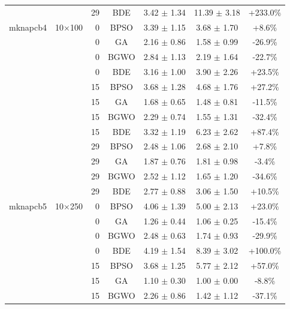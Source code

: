 \begin{table}[htbp]
\begin{tabular}{llrcccc}
             &          & 29 & BDE   & 3.42 $\pm$ 1.34    & 11.39 $\pm$ 3.18   & +233.0\% \\
mknapcb4     & 10×100   & 0 & BPSO  & 3.39 $\pm$ 1.15    & 3.68 $\pm$ 1.70    & +8.6\% \\
             &          & 0 & GA    & 2.16 $\pm$ 0.86    & 1.58 $\pm$ 0.99    & -26.9\% \\
             &          & 0 & BGWO  & 2.84 $\pm$ 1.13    & 2.19 $\pm$ 1.64    & -22.7\% \\
             &          & 0 & BDE   & 3.16 $\pm$ 1.00    & 3.90 $\pm$ 2.26    & +23.5\% \\
             &          & 15 & BPSO  & 3.68 $\pm$ 1.28    & 4.68 $\pm$ 1.76    & +27.2\% \\
             &          & 15 & GA    & 1.68 $\pm$ 0.65    & 1.48 $\pm$ 0.81    & -11.5\% \\
             &          & 15 & BGWO  & 2.29 $\pm$ 0.74    & 1.55 $\pm$ 1.31    & -32.4\% \\
             &          & 15 & BDE   & 3.32 $\pm$ 1.19    & 6.23 $\pm$ 2.62    & +87.4\% \\
             &          & 29 & BPSO  & 2.48 $\pm$ 1.06    & 2.68 $\pm$ 2.10    & +7.8\% \\
             &          & 29 & GA    & 1.87 $\pm$ 0.76    & 1.81 $\pm$ 0.98    & -3.4\% \\
             &          & 29 & BGWO  & 2.52 $\pm$ 1.12    & 1.65 $\pm$ 1.20    & -34.6\% \\
             &          & 29 & BDE   & 2.77 $\pm$ 0.88    & 3.06 $\pm$ 1.50    & +10.5\% \\
mknapcb5     & 10×250   & 0 & BPSO  & 4.06 $\pm$ 1.39    & 5.00 $\pm$ 2.13    & +23.0\% \\
             &          & 0 & GA    & 1.26 $\pm$ 0.44    & 1.06 $\pm$ 0.25    & -15.4\% \\
             &          & 0 & BGWO  & 2.48 $\pm$ 0.63    & 1.74 $\pm$ 0.93    & -29.9\% \\
             &          & 0 & BDE   & 4.19 $\pm$ 1.54    & 8.39 $\pm$ 3.02    & +100.0\% \\
             &          & 15 & BPSO  & 3.68 $\pm$ 1.25    & 5.77 $\pm$ 2.12    & +57.0\% \\
             &          & 15 & GA    & 1.10 $\pm$ 0.30    & 1.00 $\pm$ 0.00    & -8.8\% \\
             &          & 15 & BGWO  & 2.26 $\pm$ 0.86    & 1.42 $\pm$ 1.12    & -37.1\% \\

\end{tabular}
\end{table}
